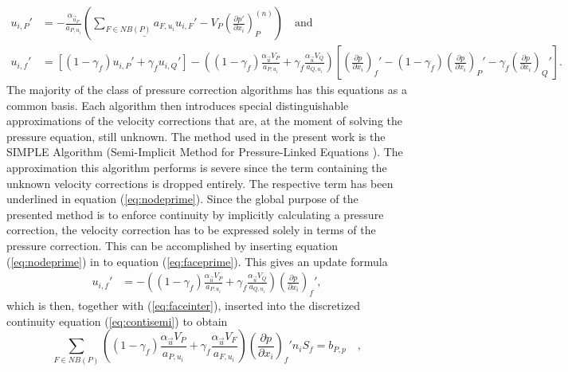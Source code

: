   \begin{align}
    \label{eq:nodeprime}
    u_{i,P}' 
    &=  
    - \frac{\alpha_{\vec{u}_P}}{a_{P,u_i}} \left(\underline{\sum_{F \in NB(P)} a_{F,u_i} u_{i,F}'}
    - V_P\left(\frac{\partial p'}{\partial x_i}\right)_P^{(n)} \right) \quad \text{and}\\[1em]
    \label{eq:faceprime}
    u_{i,f}' 
    &= 
    \left[\left(1 - \gamma_f\right) u_{i,P}' + \gamma_f u_{i,Q}' \right] 
    - 
    \left(\left(1 - \gamma_f\right) \frac{\alpha_\vec{u} V_P}{a_{P,u_i}} + \gamma_f \frac{\alpha_\vec{u} V_Q}{a_{Q,u_i}}\right)
    \left[ 
    \left(\frac{\partial p}{\partial x_i}\right)_f' 
    - \left( 1 - \gamma_f \right) \left( \frac{\partial p}{\partial x_i} \right)_P' 
    - \gamma_f \left(\frac{\partial p}{\partial x_i}\right)_Q' 
    \right].
  \end{align}
  The majority of the class of pressure correction algorithms has this equations as a common basis. Each algorithm then introduces special distinguishable approximations of the velocity corrections that are, at the moment of solving the pressure equation, still unknown. The method used in the present work is the SIMPLE Algorithm (Semi-Implicit Method for Pressure-Linked Equations \cite{patankar72}). The approximation this algorithm performs is severe since the term containing the unknown velocity corrections is dropped entirely. The respective term has been underlined in equation (\ref{eq:nodeprime}). Since the global purpose of the presented method is to enforce continuity by implicitly calculating a pressure correction, the velocity correction has to be expressed solely in terms of the pressure correction. This can be accomplished by inserting equation (\ref{eq:nodeprime}) in to equation (\ref{eq:faceprime}). This gives an update formula
  \begin{align}
    u_{i,f}' 
    &= 
    - \left(\left(1 - \gamma_f\right) \frac{\alpha_\vec{u} V_P}{a_{P,u_i}} + \gamma_f \frac{\alpha_\vec{u} V_Q}{a_{Q,u_i}}\right)
    \left(\frac{\partial p}{\partial x_i}\right)_f',
  \end{align}
  which is then, together with (\ref{eq:faceinter}), inserted into the discretized continuity equation (\ref{eq:contisemi}) to obtain
  \begin{equation}
    \label{eq:presscorr}
    \sum_{F \in NB(P)} \left(\left(1 - \gamma_f\right) \frac{\alpha_\vec{u} V_P}{a_{P,u_i}} + \gamma_f \frac{\alpha_\vec{u} V_F}{a_{F,u_i}}\right)
    \left(\frac{\partial p}{\partial x_i}\right)_f' n_i S_f
    = b_{P,p}
    \quad,
  \end{equation}
